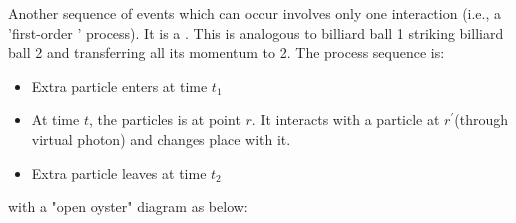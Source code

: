 Another sequence of events which can occur involves only one interaction (i.e., a 'first-order ' process). It is a . This is analogous to billiard ball 1 striking billiard ball 2 and transferring all its momentum to 2. The process sequence is:
\begin{itemize}
    \item Extra particle enters at time $t_1$
    \item At time $t$, the particles is at point $r$. It interacts with a particle at $r^{\prime}$(through virtual photon) and changes place with it.
    \item Extra particle leaves at time $t_2$
\end{itemize}
with a "open oyster" diagram as below:
